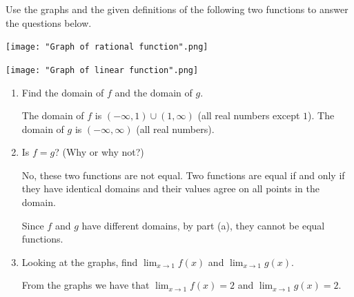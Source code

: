 \documentclass[nooutcomes]{ximera}
\begin{document}
\begin{problem}
Use the graphs and the given definitions of the following two functions to answer the questions below.
	
	\begin{image}

    \texttt{[image: "Graph of rational function".png]}
  \end{image}
\begin{image}
        \texttt{[image: "Graph of linear function".png]}
  \end{image}

	\begin{enumerate}
	
	  \item Find the domain of $f$ and the domain of $g$.
      \begin{freeResponse}
        The domain of $f$ is $(-\infty, 1) \cup (1, \infty)$ (all real numbers except $1$).
        The domain of $g$ is $(-\infty, \infty)$ (all real numbers).
      \end{freeResponse}
	
  	\item Is $f = g$?
      (Why or why not?)
      \begin{freeResponse}
        No, these two functions are not equal.
        Two functions are equal if and only if they have identical domains and their values agree on all points in the domain.

        Since $f$ and $g$ have different domains, by part (a), they cannot be equal functions.
	\end{freeResponse}
	
	 \item  Looking at the graphs, find $\lim_{x \to 1} f(x)$ and $\lim_{x \to 1} g(x)$.
      \begin{freeResponse}
        From the graphs we have that $\lim_{x \to 1} f(x) = 2$ and $\lim_{x \to 1} g(x) = 2$.
      \end{freeResponse}

	\end{enumerate}
\end{problem}
			
\end{document}
